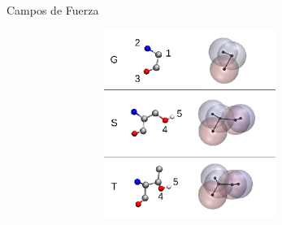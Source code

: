 \documentclass[8pt]{beamer}
\begin{document}
\begin{frame}[t]{Campos de Fuerza}
\begin{figure}
\begin{figure}[ht]
{\begin{subfigure}[t]{.32\textwidth}
  \includegraphics[width=0.8\textwidth]{Figure/FF-CG.png}
\end{subfigure}
}
\hspace*{\fill}
\end{figure}
\end{figure}
\end{frame}
\end{document}
